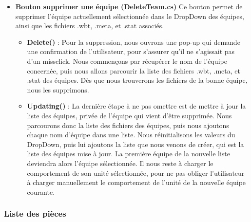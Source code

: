 \documentclass{article}
\begin{document}
\begin{itemize}
\item\textbf{Bouton supprimer une équipe (DeleteTeam.cs)}
Ce bouton permet de supprimer l'équipe actuellement sélectionnée dans le DropDown des équipes, ainsi que les fichiers .wbt, .meta, et .stat associés.
\begin{itemize}
\item\textbf{Delete()} : Pour la suppression, nous ouvrons une pop-up qui demande une confirmation de l'utilisateur, pour s'assurer qu'il ne s'agissait pas d'un missclick.\newline
Nous commençons par récupérer le nom de l'équipe concernée, puis nous allons parcourir la liste des fichiers .wbt, .meta, et .stat des équipes. Dès que nous trouverons les fichiers de la bonne équipe, nous les supprimons.\newline
\item\textbf{Updating()} : La dernière étape à ne pas omettre est de mettre à jour la liste des équipes, privée de l'équipe qui vient d'être supprimée. Nous parcourons donc la liste des fichiers des équipes, puis nous ajoutons chaque nom d'équipe dans une liste.\newline
Nous réinitialisons les valeurs du DropDown, puis lui ajoutons la liste que nous venons de créer, qui est la liste des équipes mise à jour. La première équipe de la nouvelle liste deviendra alors l'équipe sélectionnée. Il nous reste à charger le comportement de son unité sélectionnée, pour ne pas obliger l'utilisateur à charger manuellement le comportement de l'unité de la nouvelle équipe courante.
\end{itemize}
\end{itemize}

\subsubsection{Liste des pièces}
\end{document}
